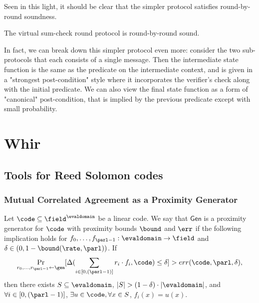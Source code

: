 Seen in this light, it should be clear that the simpler protocol satisfies round-by-round soundness.

\begin{theorem}
    The virtual sum-check round protocol is round-by-round sound.
    \label{thm:virtual_sumcheck_round_protocol_rbr_sound}
\end{theorem}

In fact, we can break down this simpler protocol even more: consider the two sub-protocols that each
consists of a single message. Then the intermediate state function is the same as the predicate on
the intermediate context, and is given in a "strongest post-condition" style where it incorporates
the verifier's check along with the initial predicate. We can also view the final state function as
a form of "canonical" post-condition, that is implied by the previous predicate except with small
probability.



\section{Whir}

\subsection{Tools for Reed Solomon codes}

\subsubsection{Mutual Correlated Agreement as a Proximity Generator}

\begin{definition}\label{def:proximity_generator}
Let $\code\subseteq \field^{\evaldomain}$ be a linear code. We say that $\mathsf{Gen}$ is a proximity generator for $\code$ with proximity bounds ${\bound}$ and $\err$ if the following implication holds for $f_0,\ldots,f_{\parl-1} : \evaldomain \rightarrow \field$ and $\delta\in(0,1-{\bound}(\rate,\parl))$. If
\begin{align*}
    \Pr_{r_0,\ldots,r_{\parl-1}\leftarrow \gen}[\Delta(\sum_{i\in[0,(\parl-1)]} r_i \cdot f_i, \code) \le \delta] > err(\code,\parl,\delta),
\end{align*}
then there exists $S\subseteq \evaldomain$, $|S|>(1-\delta)\cdot|\evaldomain|$, and
$\forall i \in [0, (\parl-1)]$, $\exists u \in \code, \forall x \in S$, $f_i(x)=u(x)$. 
\end{definition}

